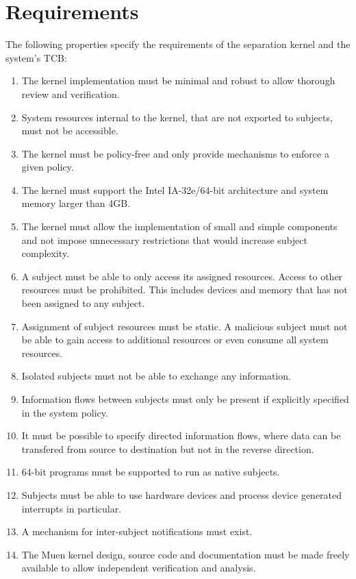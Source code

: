 \section{Requirements}

The following properties specify the requirements of the separation kernel and
the system's TCB:
\begin{enumerate}
	\item The kernel implementation must be minimal and robust to allow thorough
		review and verification.
	\item System resources internal to the kernel, that are not exported to
		subjects, must not be accessible.
	\item The kernel must be policy-free and only provide mechanisms to enforce
		a given policy.
	\item The kernel must support the Intel IA-32e/64-bit architecture and
		system memory larger than 4GB.
	\item The kernel must allow the implementation of small and simple
		components and not impose unnecessary restrictions that would increase
		subject complexity.
	\item A subject must be able to only access its assigned resources. Access
		to other resources must be prohibited. This includes devices and memory
		that has not been assigned to any subject.
	\item Assignment of subject resources must be static. A malicious subject
		must not be able to gain access to additional resources or even consume
		all system resources.
	\item Isolated subjects must not be able to exchange any information.
	\item Information flows between subjects must only be present if explicitly
		specified in the system policy.
	\item It must be possible to specify directed information flows, where data
		can be transfered from source to destination but not in the reverse
		direction.
	\item 64-bit programs must be supported to run as native subjects.
	\item Subjects must be able to use hardware devices and process device
		generated interrupts in particular.
	\item A mechanism for inter-subject notifications must exist.
	\item The Muen kernel design, source code and documentation must be made
		freely available to allow independent verification and analysis.
\end{enumerate}
